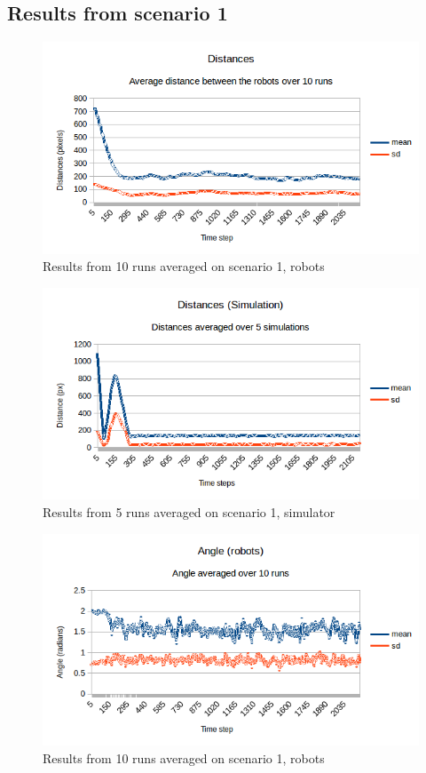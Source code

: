 \subsection{Results from scenario 1}
\label{sec:res1}
\begin{figure}[h]
\begin{center}
\includegraphics[width=0.8\linewidth]{figs/runs/1pdist}
\end{center}
\caption[1. Distances, robots]{Results from 10 runs averaged on scenario 1, robots}
\label{fig:res1pdist}
\end{figure}
\begin{figure}[h]
\begin{center}
\includegraphics[width=0.8\linewidth]{figs/runs/1sdist}
\end{center}
\caption[1. Distances, simulation]{Results from 5 runs averaged on scenario 1, simulator}
\label{fig:res1sdist}
\end{figure}
\begin{figure}[h]
\begin{center}
\includegraphics[width=0.8\linewidth]{figs/runs/1pangle}
\end{center}
\caption[1. Angle, robots]{Results from 10 runs averaged on scenario 1, robots}
\label{fig:res1pang}
\end{figure}

